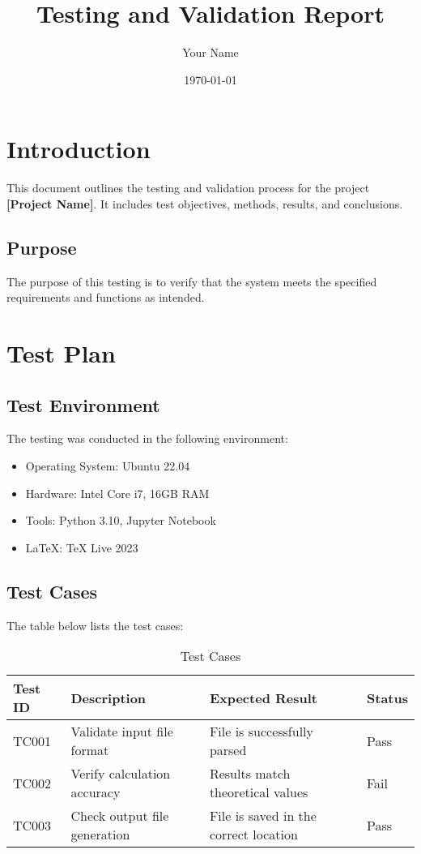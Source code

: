 \documentclass[a4paper,12pt]{article}
\title{Testing and Validation Report}
\author{Your Name}
\date{\today}
\begin{document}
\maketitle
\tableofcontents
\newpage

\section{Introduction}
This document outlines the testing and validation process for the project \textbf{[Project Name]}. It includes test objectives, methods, results, and conclusions.

\subsection{Purpose}
The purpose of this testing is to verify that the system meets the specified requirements and functions as intended.

\section{Test Plan}
\subsection{Test Environment}
The testing was conducted in the following environment:
\begin{itemize}
    \item Operating System: Ubuntu 22.04
    \item Hardware: Intel Core i7, 16GB RAM
    \item Tools: Python 3.10, Jupyter Notebook
    \item LaTeX: TeX Live 2023
\end{itemize}

\subsection{Test Cases}
The table below lists the test cases:

\begin{table}[h!]
    \centering
    \begin{tabular}{|l|p{8cm}|l|l|}
        \hline
        \textbf{Test ID} & \textbf{Description} & \textbf{Expected Result} & \textbf{Status} \\ \hline
        TC001 & Validate input file format & File is successfully parsed & Pass \\ \hline
        TC002 & Verify calculation accuracy & Results match theoretical values & Fail \\ \hline
        TC003 & Check output file generation & File is saved in the correct location & Pass \\ \hline
    \end{tabular}
    \caption{Test Cases}
    \label{tab:testcases}
\end{table}
\end{document}
